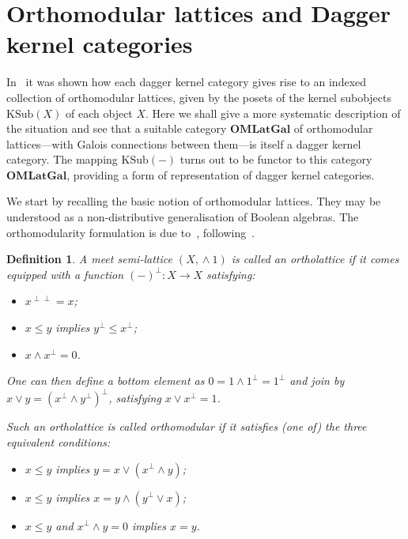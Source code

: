 \documentclass{article}
\newtheorem{definition}[theorem]{Definition}
\newcommand{\Cat}[1]{\ensuremath{\mathbf{#1}}}
\newcommand{\KSub}{\ensuremath{\mathrm{KSub}}}
\newcommand{\conjun}{\mathrel{\wedge}}
\newcommand{\disjun}{\mathrel{\vee}}
\begin{document}
\section{Orthomodular lattices and Dagger kernel categories}\label{OMLatDagKerSec}

In~\cite{HeunenJ09a} it was shown how each dagger kernel category
gives rise to an indexed collection of orthomodular lattices, given by
the posets of the kernel subobjects $\KSub(X)$ of each object
$X$. Here we shall give a more systematic description of the situation
and see that a suitable category \Cat{OMLatGal} of orthomodular
lattices---with Galois connections between them---is itself a dagger
kernel category.  The mapping $\KSub(-)$ turns out to be functor to
this category \Cat{OMLatGal}, providing a form of representation of
dagger kernel categories.

We start by recalling the basic notion of orthomodular lattices.  They
may be understood as a non-distributive generalisation of Boolean
algebras. The orthomodularity formulation is due to~\cite{Husimi37},
following~\cite{BirkhoffN36}.



\begin{definition}
\label{OMLatDef}
A meet semi-lattice $(X,\conjun 1)$ is called an ortholattice if it
comes equipped with a function $(-)^{\perp}\colon X \to X$ satisfying:
\begin{itemize}
   \item $x^{\perp\perp} = x$;
   \item $x \leq y$ implies $y^\perp \leq x^\perp$;
   \item $x \conjun x^\perp = 0$.
\end{itemize}

\noindent One can then define a bottom element as $0 = 1 \conjun
1^{\perp} = 1^\perp$ and join by $x\disjun y = (x^{\perp}\conjun
y^{\perp})^{\perp}$, satisfying $x\disjun x^{\perp} = 1$.

Such an ortholattice is called orthomodular if it satisfies (one of)
the three equivalent conditions:
\begin{itemize}
\item $x \leq y$ implies $y = x \disjun (x^\perp \conjun y)$;

\item $x \leq y$ implies $x = y \conjun (y^\perp \disjun x)$;

\item $x \leq y$ and $x^{\perp} \conjun y = 0$ implies $x=y$.
\end{itemize}
\end{definition}
\end{document}
